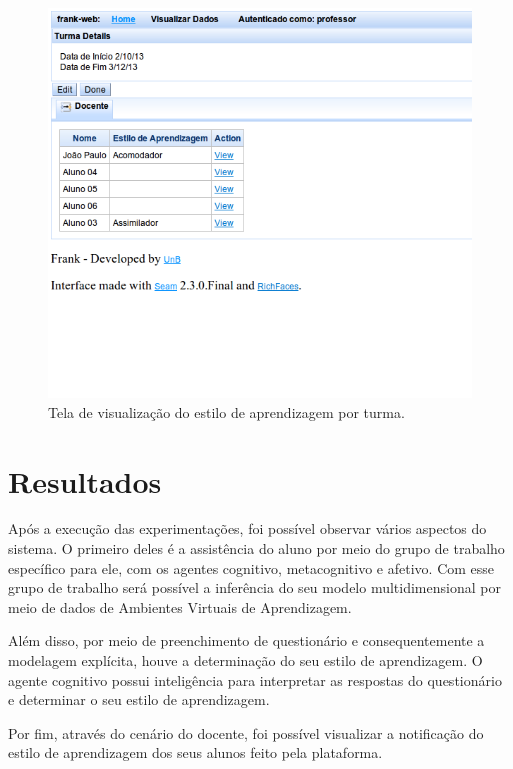\begin{figure}
	\centering
	\includegraphics[scale=0.48]{images/frank-tela-professor-visualizar-turma.png}
	\caption{Tela de visualização do estilo de aprendizagem por turma.}
	\label{fig:frank-tela-professor-visualizar-turma}
\end{figure}

\section{Resultados}\label{section:resultados}
Após a execução das experimentações, foi possível observar vários aspectos do sistema. O primeiro deles é a assistência do aluno por meio do grupo de trabalho específico para ele, com os agentes cognitivo, metacognitivo e afetivo. Com esse grupo de trabalho será possível a inferência do seu modelo multidimensional por meio de dados de Ambientes Virtuais de Aprendizagem.

Além disso, por meio de preenchimento de questionário e consequentemente a modelagem explícita, houve a determinação do seu estilo de aprendizagem. O agente cognitivo possui inteligência para interpretar as respostas do questionário e determinar o seu estilo de aprendizagem.

Por fim, através do cenário do docente, foi possível visualizar a notificação do estilo de aprendizagem dos seus alunos feito pela plataforma.
